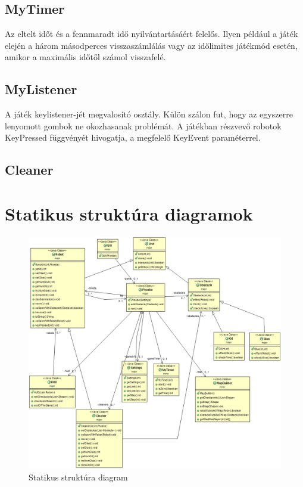 \subsection{MyTimer}
Az eltelt időt és a fennmaradt idő nyilvántartásáért felelős. Ilyen például a játék elején a három másodperces visszaszámlálás vagy az időlimites játékmód esetén, amikor a maximális időtől számol visszafelé.

\subsection{MyListener}
A játék keylistener-jét megvalosító osztály. Külön szálon fut, hogy az egyszerre lenyomott gombok ne okozhasanak problémát. A játékban részvevő robotok KeyPressed függvényét hivogatja, a megfelelő KeyEvent paraméterrel.
\subsection{Cleaner}

\section{Statikus struktúra diagramok}

\begin{figure}[h]
\begin{center}
\includegraphics[width=17cm]{images/struktdiagram.PNG}
\caption{Statikus struktúra diagram}
\label{fig:example3}
\end{center}
\end{figure}
\pagebreak


